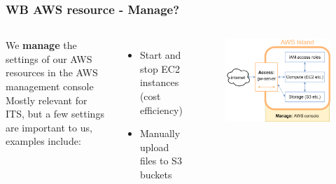 \documentclass[aspectratio=169]{beamer} %
\begin{document}
\begin{frame}
	\frametitle{WB AWS resource - Manage?}
	\begin{columns}[c]
		We \textbf{manage} the settings of our AWS resources in the AWS management console
		\vspace{1cm}\newline
		Mostly relevant for ITS, but a few settings are important to us, examples include:
		\begin{itemize}
			\item Start and stop EC2 instances (cost efficiency)
			\item Manually upload files to S3 buckets
		\end{itemize}
		
		\begin{figure}
			\centering
			\includegraphics[width=\textwidth]{./img/wb-aws.png}
		\end{figure}
		
	\end{columns}
\end{frame}
\end{document}
